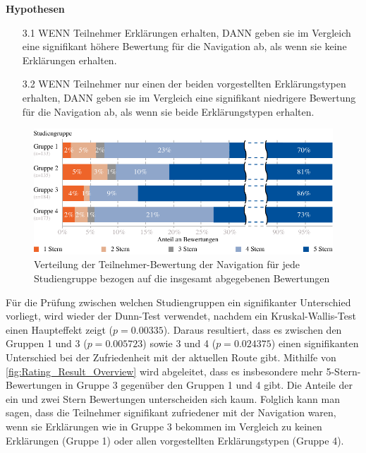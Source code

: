 \textbf{Hypothesen}

\begin{enumerate}
    \item[3.1] WENN Teilnehmer Erklärungen erhalten, DANN geben sie im Vergleich eine signifikant höhere Bewertung für die Navigation ab, als wenn sie keine Erklärungen erhalten.
    \item[3.2] WENN Teilnehmer nur einen der beiden vorgestellten Erklärungstypen erhalten, DANN geben sie im Vergleich eine signifikant niedrigere Bewertung für die Navigation ab, als wenn sie beide Erklärungstypen erhalten.
\end{enumerate}

\begin{figure}
    \centering
    \includegraphics[width=\linewidth]{contents/06_model_evaluation/02_evaluation/res/rating_result_overview.pdf}
    \caption{Verteilung der Teilnehmer-Bewertung der Navigation für jede Studiengruppe bezogen auf die insgesamt abgegebenen Bewertungen}
    \label{fig:Rating_Result_Overview}
\end{figure}

Für die Prüfung zwischen welchen Studiengruppen ein signifikanter Unterschied vorliegt, wird wieder der Dunn-Test \cite{dunn1964multiple} verwendet, nachdem ein Kruskal-Wallis-Test einen Haupteffekt zeigt ($ p = 0.00335 $). Daraus resultiert, dass es zwischen den Gruppen 1 und 3 ($ p = 0.005723$) sowie 3 und 4 ($ p = 0.024375 $) einen signifikanten Unterschied bei der Zufriedenheit mit der aktuellen Route gibt. Mithilfe von \autoref{fig:Rating_Result_Overview} wird abgeleitet, dass es insbesondere mehr 5-Stern-Bewertungen in Gruppe 3 gegenüber den Gruppen 1 und 4 gibt. Die Anteile der ein und zwei Stern Bewertungen unterscheiden sich kaum. Folglich kann man sagen, dass die Teilnehmer signifikant zufriedener mit der Navigation waren, wenn sie Erklärungen wie in Gruppe 3 bekommen im Vergleich zu keinen Erklärungen (Gruppe 1) oder allen vorgestellten Erklärungstypen (Gruppe 4).

